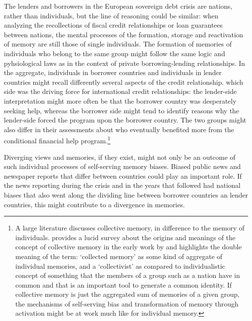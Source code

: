 The lenders and borrowers in the European sovereign debt crisis are
nations, rather than individuals, but the line of reasoning could be
similar: when analyzing the recollections of fiscal credit relationships or
loan guarantees between nations, the mental processes of the formation,
storage and reactivation of memory are still those of single individuals.
The formation of memories of individuals who belong to the same group might
follow the same logic and pyhsiological laws as in the context of private
borrowing-lending relationships. In the aggregate, individuals in borrower
countries and individuals in lender countries might recall differently
several aspects of the credit relationship. which
side was the driving force for international credit relationships: the
lender-side interpretation might more often be that the borrower country was
desperately seeking help, whereas the borrower side might tend to identify
reasons why the lender-side forced the program upon the borrower country.
The two groups might also differ in their assessments about who eventually
benefited more from the conditional financial help program.\footnote{%
A large literature discusses collective memory, in difference to the memory
of individuals. \cite{olick} provides a lucid survey about the origins and
meanings of the concept of collective memory in the early work by \cite{halbwachs}
and highlights the double meaning of the term: `collected
memory' as some kind of aggregate of individual memories, and a
`collectivist' as compared to individualistic concept of something that the
members of a group such as a nation have in common and that is an important
tool to generate a common identity. If collective memory is just the
aggregated sum of memories of a given group, the mechanisms of self-serving
bias and transformation of memory through activation might be at work much
like for individual memory.}

Diverging views and memories, if they exist, might not only be an outcome of
such individual processes of self-serving memory biases. Biased public news
and newspaper reports that differ between countries could play an important
role. If the news reporting during the crisis and in the years that followed
had national biases that also went along the dividing line between borrower
countries an lender countries, this might contribute to a divergence in
memories. 


